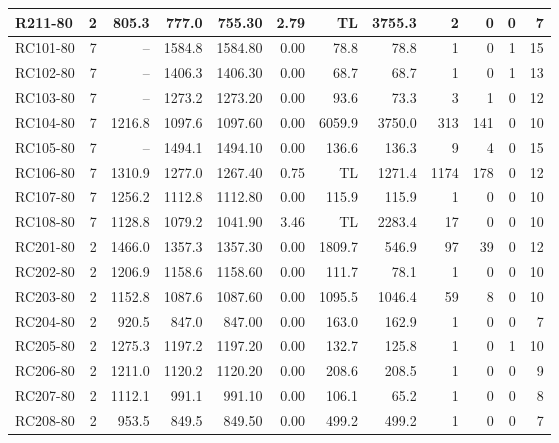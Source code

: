 \documentclass[10pt]{article}
\begin{document}
\begin{table}[p]
\begin{tabular}{lrrrrrrrrrrr}
R211-80 & 2 & 805.3 & 777.0 & 755.30 & 2.79 & TL & 3755.3 & 2 & 0 & 0 & 7 \\
\midrule
RC101-80 & 7 & -- & 1584.8 & 1584.80 & 0.00 & 78.8 & 78.8 & 1 & 0 & 1 & 15 \\
RC102-80 & 7 & -- & 1406.3 & 1406.30 & 0.00 & 68.7 & 68.7 & 1 & 0 & 1 & 13 \\
RC103-80 & 7 & -- & 1273.2 & 1273.20 & 0.00 & 93.6 & 73.3 & 3 & 1 & 0 & 12 \\
RC104-80 & 7 & 1216.8 & 1097.6 & 1097.60 & 0.00 & 6059.9 & 3750.0 & 313 & 141 & 0 & 10 \\
RC105-80 & 7 & -- & 1494.1 & 1494.10 & 0.00 & 136.6 & 136.3 & 9 & 4 & 0 & 15 \\
RC106-80 & 7 & 1310.9 & 1277.0 & 1267.40 & 0.75 & TL & 1271.4 & 1174 & 178 & 0 & 12 \\
RC107-80 & 7 & 1256.2 & 1112.8 & 1112.80 & 0.00 & 115.9 & 115.9 & 1 & 0 & 0 & 10 \\
RC108-80 & 7 & 1128.8 & 1079.2 & 1041.90 & 3.46 & TL & 2283.4 & 17 & 0 & 0 & 10 \\
\midrule
RC201-80 & 2 & 1466.0 & 1357.3 & 1357.30 & 0.00 & 1809.7 & 546.9 & 97 & 39 & 0 & 12 \\
RC202-80 & 2 & 1206.9 & 1158.6 & 1158.60 & 0.00 & 111.7 & 78.1 & 1 & 0 & 0 & 10 \\
RC203-80 & 2 & 1152.8 & 1087.6 & 1087.60 & 0.00 & 1095.5 & 1046.4 & 59 & 8 & 0 & 10 \\
RC204-80 & 2 & 920.5 & 847.0 & 847.00 & 0.00 & 163.0 & 162.9 & 1 & 0 & 0 & 7 \\
RC205-80 & 2 & 1275.3 & 1197.2 & 1197.20 & 0.00 & 132.7 & 125.8 & 1 & 0 & 1 & 10 \\
RC206-80 & 2 & 1211.0 & 1120.2 & 1120.20 & 0.00 & 208.6 & 208.5 & 1 & 0 & 0 & 9 \\
RC207-80 & 2 & 1112.1 & 991.1 & 991.10 & 0.00 & 106.1 & 65.2 & 1 & 0 & 0 & 8 \\
RC208-80 & 2 & 953.5 & 849.5 & 849.50 & 0.00 & 499.2 & 499.2 & 1 & 0 & 0 & 7 \\
\bottomrule
\end{tabular}
\end{table}
\clearpage
\end{document}

